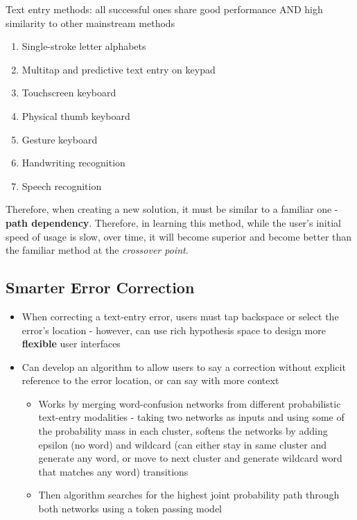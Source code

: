 \documentclass{article}
\begin{document}
Text entry methods: all successful ones share good performance AND high similarity to other mainstream methods
\begin{enumerate}
    \item Single-stroke letter alphabets
    \item Multitap and predictive text entry on keypad
    \item Touchscreen keyboard
    \item Physical thumb keyboard
    \item Gesture keyboard
    \item Handwriting recognition
    \item Speech recognition
\end{enumerate}

Therefore, when creating a new solution, it must be similar to a familiar one - \textbf{path dependency}. Therefore, in learning this method, while the user's initial speed of usage is slow, over time, it will become superior and become better than the familiar method at the \textit{crossover point}. 

\subsection{Smarter Error Correction}
\begin{itemize}
    \item When correcting a text-entry error, users must tap backspace or select the error's location - however, can use rich hypothesis space to design more \textbf{flexible} user interfaces
    \item Can develop an algorithm to allow users to say a correction without explicit reference to the error location, or can say with more context
    \begin{itemize}
        \item Works by merging word-confusion networks from different probabilistic text-entry modalities - taking two networks as inputs and using some of the probability mass in each cluster, softens the networks by adding epsilon (no word) and wildcard (can either stay in same cluster and generate any word, or move to next cluster and generate wildcard word that matches any word) transitions
        \item Then algorithm searches for the highest joint probability path through both networks using a token passing model
    \end{itemize}
\end{itemize}
\end{document}

